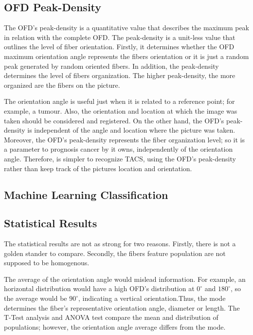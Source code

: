 \documentclass[12pt,a4paper]{article}
\begin{document}
\subsection{OFD Peak-Density}

The OFD's peak-density is a quantitative value that describes the maximum peak in relation with the complete OFD. The peak-density is a unit-less value that outlines the level of fiber orientation. Firstly, it determines whether the  OFD maximum orientation angle represents the fibers orientation or it is just a random peak generated by random oriented fibers. In addition, the peak-density determines the level of fibers organization. The higher peak-density, the more organized are the fibers on the picture. 
 
The orientation angle is useful just when it is related to a reference point; for example, a tumour. Also, the orientation and location at which the image was taken should be considered and registered. On the other hand, the OFD's peak-density is independent of the angle and location where the picture was taken. Moreover, the OFD's peak-density represents the fiber organization level; so it is a parameter to prognosis cancer by it owns, independently of the orientation angle. Therefore, is simpler to recognize TACS, using the OFD's peak-density rather than keep track of the pictures location and orientation. 

\subsection{Machine Learning Classification}


\subsection{Statistical Results}

The statistical results are not as strong for two reasons. Firstly, there is not a golden stander to compare. Secondly, the fibers feature population are not supposed to be homogenous. 

 The average of the orientation angle would mislead information. For example, an horizontal distribution would have a high OFD's distribution at $0^{\circ}$ and $180^{\circ}$, so the average would be $90^{\circ}$, indicating a vertical orientation.Thus,   the mode determines the fiber's representative orientation angle, diameter or length. The T-Test analysis and ANOVA test compare the mean and distribution of populations; however, the orientation angle average differs from the mode. 
 
\end{document}
